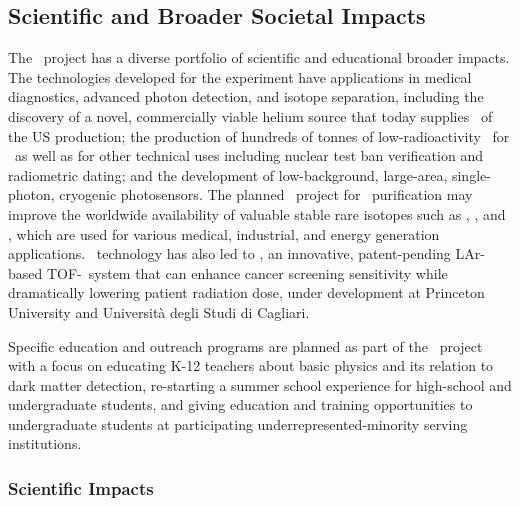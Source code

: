 \subsection{Scientific and Broader Societal Impacts}

The \DSks\ project has a diverse portfolio of scientific and educational broader impacts. The technologies developed for the experiment have applications in medical diagnostics, advanced photon detection, and isotope separation, including the discovery of a novel, commercially viable helium source that today supplies \UraniaHeNationalReserveFractionEquivalentRate\ of the US production; the production of hundreds of tonnes of low-radioactivity \UAr\ for \DSks\ as well as for other technical uses including nuclear test ban verification and radiometric dating; and the development of low-background, large-area, single-photon, cryogenic photosensors.  The planned \Aria\ project for \UAr\ purification may improve the worldwide availability of valuable stable rare isotopes such as , , and , which are used for various medical, industrial, and energy generation applications.  \DSs\ technology has also led to \ThreeDPi, an innovative, patent-pending LAr-based TOF-\PET\ system that can enhance cancer screening sensitivity while dramatically lowering patient radiation dose, under development at Princeton University and Universit\`{a} degli Studi di Cagliari.

Specific education and outreach programs are planned as part of the \DSks\ project with a focus on educating K-12 teachers about basic physics and its relation to dark matter detection, re-starting a summer school experience for high-school and undergraduate students, and giving education and training opportunities to undergraduate students at participating underrepresented-minority serving institutions.

\subsubsection{Scientific Impacts}

